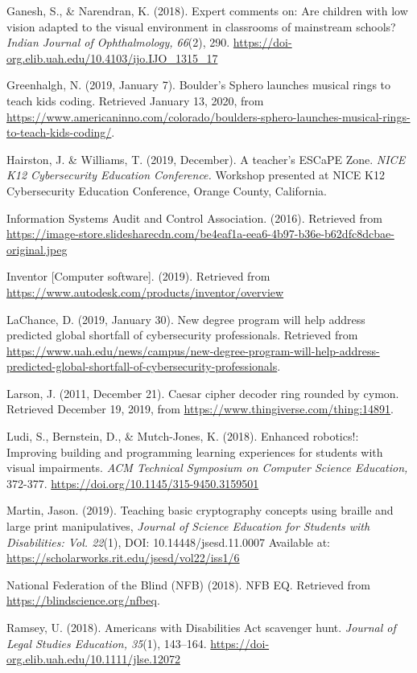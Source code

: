 \documentclass[11.5pt]{sig-alternate} %
\begin{document}
\begin{hangparas}{0.25in}{1}
Ganesh, S., \& Narendran, K. (2018). Expert comments on: Are children with low vision adapted to the visual environment in classrooms of mainstream schools? \textit{Indian Journal of Ophthalmology, 66}(2), 290. \url{https://doi-org.elib.uah.edu/10.4103/ijo.IJO\_1315\_17}

Greenhalgh, N. (2019, January 7). Boulder’s Sphero launches musical rings to teach kids coding. Retrieved January 13, 2020, from \url{https://www.americaninno.com/colorado/boulders-sphero-launches-musical-rings-to-teach-kids-coding/}.

Hairston, J. \& Williams, T. (2019, December). A teacher’s ESCaPE Zone. \textit{NICE K12 Cybersecurity Education Conference.} Workshop presented at NICE K12 Cybersecurity Education Conference, Orange County, California. 

Information Systems Audit and Control Association. (2016). Retrieved from \url{https://image-store.slidesharecdn.com/be4eaf1a-eea6-4b97-b36e-b62dfc8dcbae-original.jpeg}

Inventor [Computer software]. (2019). Retrieved from \url{https://www.autodesk.com/products/inventor/overview}

LaChance, D. (2019, January 30). New degree program will help address predicted global shortfall of cybersecurity professionals. Retrieved from \url{https://www.uah.edu/news/campus/new-degree-program-will-help-address-predicted-global-shortfall-of-cybersecurity-professionals}.

Larson, J. (2011, December 21). Caesar cipher decoder ring rounded by cymon. Retrieved December 19, 2019, from \url{https://www.thingiverse.com/thing:14891}.

Ludi, S., Bernstein, D., \& Mutch-Jones, K. (2018). Enhanced robotics!: Improving building and programming learning experiences for students with visual impairments. \textit{ACM Technical Symposium on Computer Science Education,} 372-377. \url{https://doi.org/10.1145/315-9450.3159501}

Martin, Jason. (2019). Teaching basic cryptography concepts using braille and large print manipulatives, \textit{Journal of Science Education for Students with Disabilities: Vol. 22}(1), DOI: 10.14448/jsesd.11.0007 Available at: \url{https://scholarworks.rit.edu/jsesd/vol22/iss1/6}

National Federation of the Blind (NFB) (2018). NFB EQ. Retrieved from \url{https://blindscience.org/nfbeq}.

Ramsey, U. (2018). Americans with Disabilities Act scavenger hunt. \textit{Journal of Legal Studies Education, 35}(1), 143–164. \url{https://doi-org.elib.uah.edu/10.1111/jlse.12072}


\end{hangparas}
\end{document}
